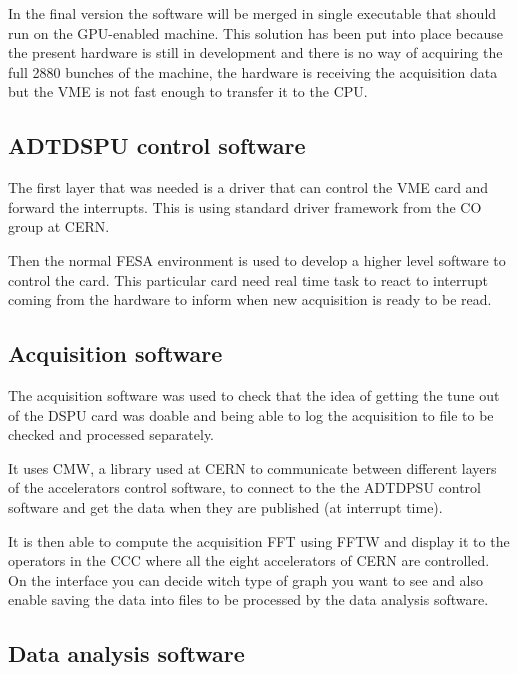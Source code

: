 In the final version the software will be merged in single executable that should run on the \gls{GPU}-enabled machine. This solution has been put into place because the present hardware is still in development and there is no way of acquiring the full 2880 bunches of the machine, the hardware is receiving the acquisition data but the \gls{VME} is not fast enough to transfer it to the \gls{CPU}.

	\subsection{ADTDSPU control software}

	The first layer that was needed is a driver that can control the \gls{VME} card and forward the interrupts. This is using standard driver framework from the \gls{CO} group at \gls{CERN}.

	Then the normal \gls{FESA} environment is used to develop a higher level software to control the card. This particular card need real time task to react to interrupt coming from the hardware to inform when new acquisition is ready to be read.

	\subsection{Acquisition software}

	The acquisition software was used to check that the idea of getting the tune out of the DSPU card was doable and being able to log the acquisition to file to be checked and processed separately.

	It uses \gls{CMW}, a library used at \gls{CERN} to communicate between different layers of the accelerators control software, to connect to the the ADTDPSU control software and get the data when they are published (at interrupt time).

	It is then able to compute the acquisition \gls{FFT} using \gls{FFTW} and display it to the operators in the \gls{CCC} where all the eight accelerators of \gls{CERN} are controlled. On the interface you can decide witch type of graph you want to see and also enable saving the data into files to be processed by the data analysis software.

	\subsection{Data analysis software}



